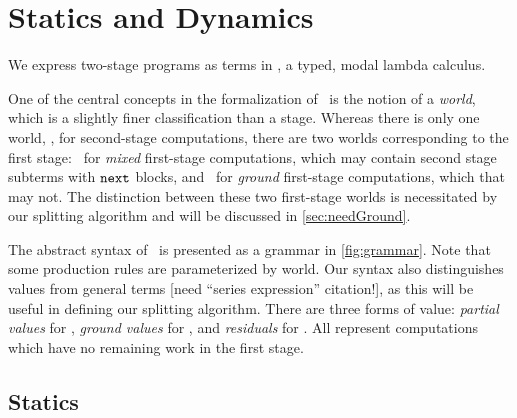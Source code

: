 
\section{\texorpdfstring{\lang}{λ12} Statics and Dynamics}
\label{sec:semantics}





We express two-stage programs as terms in \lang, a typed, modal lambda calculus. 

One of the central concepts in the formalization of \lang\ is the notion of a \emph{world},
which is a slightly finer classification than a stage.
Whereas there is only one world, \bbtwo, for second-stage computations,
there are two worlds corresponding to the first stage:
\bbonem\ for \emph{mixed} first-stage computations, which may contain second stage subterms with ${\tt next}$ blocks,
and \bbonep\ for \emph{ground} first-stage computations, which that may not.
The distinction between these two first-stage worlds is necessitated by our splitting algorithm
and will be discussed in \ref{sec:needGround}.

The abstract syntax of \lang\ is presented as a grammar in \ref{fig:grammar}.  
Note that some production rules are parameterized by world.
Our syntax also distinguishes values from general terms [need ``series expression'' citation!], 
as this will be useful in defining our splitting algorithm.
There are three forms of value: \emph{partial values} for \bbonem, \emph{ground values} for \bbonep, and \emph{residuals} for \bbtwo.
All represent computations which have no remaining work in the first stage.

\subsection{Statics}
\label{sec:statics}



